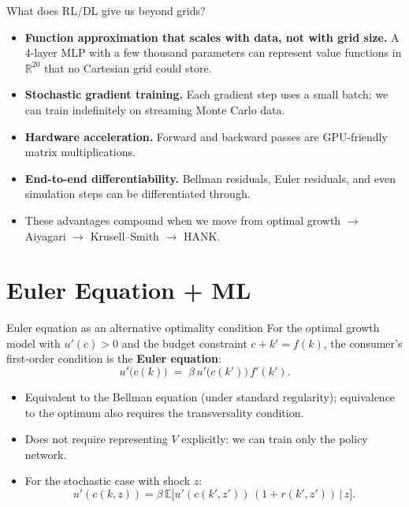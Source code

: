 \begin{frame}{What does RL/DL give us beyond grids?}
\begin{itemize}
\item \textbf{Function approximation that scales with data, not with grid size.} A 4-layer MLP with a few thousand parameters can represent value functions in $\mathbb{R}^{20}$ that no Cartesian grid could store.
\medskip
\item \textbf{Stochastic gradient training.} Each gradient step uses a small batch; we can train indefinitely on streaming Monte Carlo data.
\medskip
\item \textbf{Hardware acceleration.} Forward and backward passes are GPU-friendly matrix multiplications.
\medskip
\item \textbf{End-to-end differentiability.} Bellman residuals, Euler residuals, and even simulation steps can be differentiated through.
\medskip
\item These advantages compound when we move from optimal growth $\to$ Aiyagari $\to$ Krusell--Smith $\to$ HANK.
\end{itemize}
\end{frame}

\section{Euler Equation + ML}

\begin{frame}{Euler equation as an alternative optimality condition}
For the optimal growth model with $u'(c) > 0$ and the budget constraint $c + k' = f(k)$, the consumer's first-order condition is the \textbf{Euler equation}:
\[
u'\!\big(c(k)\big) \;=\; \beta\, u'\!\big(c(k')\big)\, f'(k').
\]
\medskip
\begin{itemize}
\item Equivalent to the Bellman equation (under standard regularity); equivalence to the optimum also requires the transversality condition.
\item Does not require representing $V$ explicitly: we can train only the policy network.
\item For the stochastic case with shock $z$:
\[
u'(c(k,z)) = \beta\,\mathbb{E}\big[u'(c(k',z'))\,(1+r(k',z'))\,\big|\,z\big].
\]
\end{itemize}
\end{frame}

